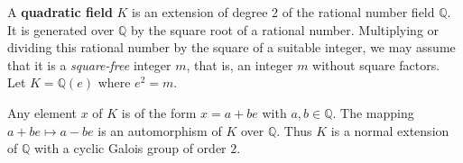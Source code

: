 A \textbf{quadratic field} $K$ is an extension of degree 2 of the rational number field $\mathbb{Q}$. It is generated over $\mathbb{Q}$ by the square root of a rational number. Multiplying or dividing this rational number by the square of a suitable integer, we may assume that it is a \textit{square-free} integer $m$, that is, an integer $m$ without square factors. Let $K = \mathbb{Q}(e)$ where $e^2 = m$.

Any element $x$ of $K$ is of the form $x = a + be$ with $a, b \in \mathbb{Q}$. The mapping $a + be \mapsto a - be$ is an automorphism of $K$ over $\mathbb{Q}$. Thus $K$ is a normal extension of $\mathbb{Q}$ with a cyclic Galois group of order $2$.
